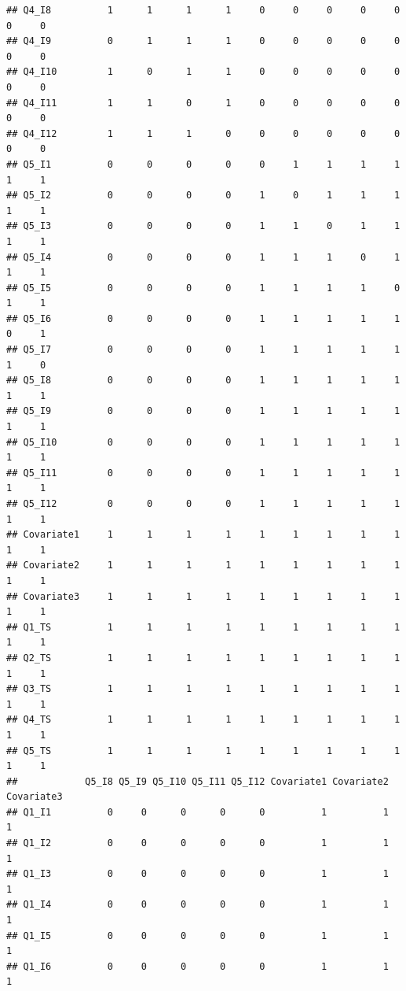 \documentclass[
]{book}
\begin{document}
\begin{verbatim}
## Q4_I8          1      1      1      1     0     0     0     0     0     0     0
## Q4_I9          0      1      1      1     0     0     0     0     0     0     0
## Q4_I10         1      0      1      1     0     0     0     0     0     0     0
## Q4_I11         1      1      0      1     0     0     0     0     0     0     0
## Q4_I12         1      1      1      0     0     0     0     0     0     0     0
## Q5_I1          0      0      0      0     0     1     1     1     1     1     1
## Q5_I2          0      0      0      0     1     0     1     1     1     1     1
## Q5_I3          0      0      0      0     1     1     0     1     1     1     1
## Q5_I4          0      0      0      0     1     1     1     0     1     1     1
## Q5_I5          0      0      0      0     1     1     1     1     0     1     1
## Q5_I6          0      0      0      0     1     1     1     1     1     0     1
## Q5_I7          0      0      0      0     1     1     1     1     1     1     0
## Q5_I8          0      0      0      0     1     1     1     1     1     1     1
## Q5_I9          0      0      0      0     1     1     1     1     1     1     1
## Q5_I10         0      0      0      0     1     1     1     1     1     1     1
## Q5_I11         0      0      0      0     1     1     1     1     1     1     1
## Q5_I12         0      0      0      0     1     1     1     1     1     1     1
## Covariate1     1      1      1      1     1     1     1     1     1     1     1
## Covariate2     1      1      1      1     1     1     1     1     1     1     1
## Covariate3     1      1      1      1     1     1     1     1     1     1     1
## Q1_TS          1      1      1      1     1     1     1     1     1     1     1
## Q2_TS          1      1      1      1     1     1     1     1     1     1     1
## Q3_TS          1      1      1      1     1     1     1     1     1     1     1
## Q4_TS          1      1      1      1     1     1     1     1     1     1     1
## Q5_TS          1      1      1      1     1     1     1     1     1     1     1
##            Q5_I8 Q5_I9 Q5_I10 Q5_I11 Q5_I12 Covariate1 Covariate2 Covariate3
## Q1_I1          0     0      0      0      0          1          1          1
## Q1_I2          0     0      0      0      0          1          1          1
## Q1_I3          0     0      0      0      0          1          1          1
## Q1_I4          0     0      0      0      0          1          1          1
## Q1_I5          0     0      0      0      0          1          1          1
## Q1_I6          0     0      0      0      0          1          1          1

\end{verbatim}
\end{document}
